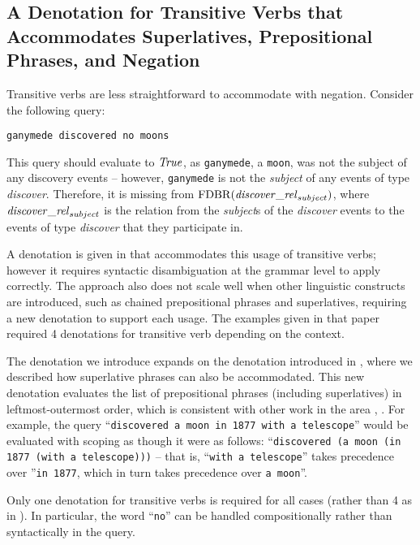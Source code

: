 \documentclass[../main.tex]{subfiles}
\begin{document}
\begin{refsection}
\subsection{A Denotation for Transitive Verbs that Accommodates Superlatives, Prepositional Phrases, and Negation}
\label{subsec:tvs}

Transitive verbs are less straightforward to accommodate with negation.  Consider the following query:
\begin{center}
    \texttt{ganymede discovered no moons}
\end{center}
\noindent This query should evaluate to $\mathit{True}$, as \texttt{ganymede}, a \texttt{moon}, was not the subject of any discovery events -- however, \texttt{ganymede} is not the \textit{subject} of any events of type \textit{discover}.  Therefore, it is missing from $\mathrm{FDBR}({\mathit{discover\_rel}_{subject}})$, where $\mathit{discover\_rel}_{subject}$ is the relation from the \textit{subject}s of the \textit{discover} events to the events of type \textit{discover} that they participate in.

A denotation is given in \cite{frostboulos2002} that accommodates this usage of transitive verbs; however it requires syntactic disambiguation at the grammar level to apply correctly.  The approach also does not scale well when other linguistic constructs are introduced, such as chained prepositional phrases and superlatives, requiring a new denotation to support each usage.  The examples given in that paper required 4 denotations for transitive verb depending on the context.

The denotation we introduce expands on the denotation introduced in \cite{frostpeelar2019}, where we described how superlative phrases can also be accommodated.  This new denotation evaluates the list of prepositional phrases (including superlatives) in leftmost-outermost order, which is consistent with other work in the area \cite{champollion2010quantification}, \cite{ferre2014squall}.  For example, the query ``\texttt{discovered a moon in 1877 with a telescope}'' would be evaluated with scoping as though it were as follows:
``\texttt{discovered (a moon (in 1877 (with a telescope)))} -- that is, ``\texttt{with a telescope}'' takes precedence over ''\texttt{in 1877}, which in turn takes precedence over \texttt{a moon}''.

Only one denotation for transitive verbs is required for all cases (rather than 4 as in \cite{frostboulos2002}). In particular, the word ``\texttt{no}'' can be handled compositionally rather than syntactically in the query.


\end{refsection}
\end{document}
